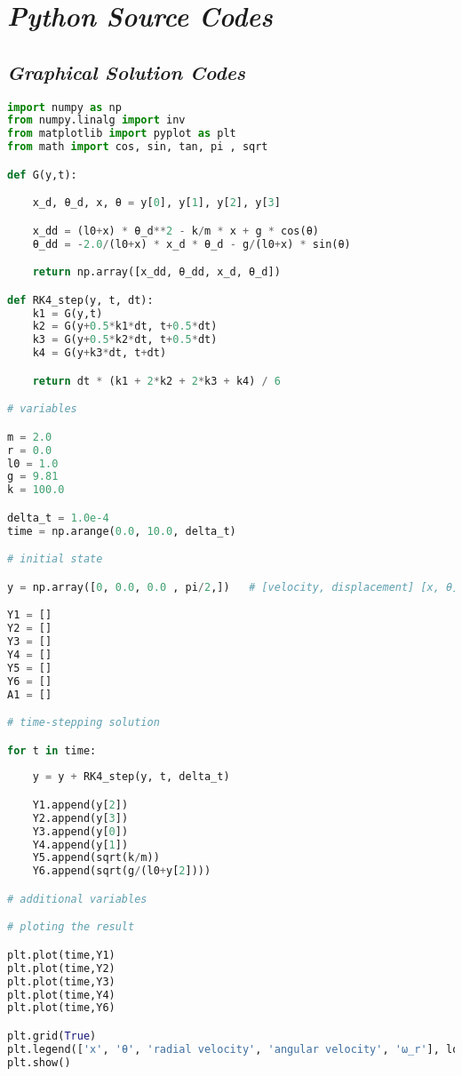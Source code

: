 \newpage

\chapter{\textit{Python Source Codes}}\label{pycode}
        
    \section{\textit{Graphical Solution Codes}}
        
        \begin{lstlisting}[language=Python, caption=\textit{Graphical Solution Python Script for system \textbf{without} Damping}]
import numpy as np 
from numpy.linalg import inv
from matplotlib import pyplot as plt
from math import cos, sin, tan, pi , sqrt

def G(y,t): 	

    x_d, θ_d, x, θ = y[0], y[1], y[2], y[3]

	x_dd = (l0+x) * θ_d**2 - k/m * x + g * cos(θ) 	
	θ_dd = -2.0/(l0+x) * x_d * θ_d - g/(l0+x) * sin(θ) 	

	return np.array([x_dd, θ_dd, x_d, θ_d])

def RK4_step(y, t, dt):
	k1 = G(y,t)
	k2 = G(y+0.5*k1*dt, t+0.5*dt)
	k3 = G(y+0.5*k2*dt, t+0.5*dt)
	k4 = G(y+k3*dt, t+dt)

	return dt * (k1 + 2*k2 + 2*k3 + k4) / 6

# variables

m = 2.0
r = 0.0
l0 = 1.0
g = 9.81
k = 100.0

delta_t = 1.0e-4
time = np.arange(0.0, 10.0, delta_t)

# initial state

y = np.array([0, 0.0, 0.0 , pi/2,])   # [velocity, displacement] [x, θ] 

Y1 = []
Y2 = []
Y3 = []
Y4 = []
Y5 = []
Y6 = []
A1 = []

# time-stepping solution

for t in time:
	
	y = y + RK4_step(y, t, delta_t) 

	Y1.append(y[2])
	Y2.append(y[3])
	Y3.append(y[0])
	Y4.append(y[1])
	Y5.append(sqrt(k/m))
	Y6.append(sqrt(g/(l0+y[2])))

# additional variables

# ploting the result

plt.plot(time,Y1)
plt.plot(time,Y2)
plt.plot(time,Y3)
plt.plot(time,Y4)
plt.plot(time,Y6)

plt.grid(True)
plt.legend(['x', 'θ', 'radial velocity', 'angular velocity', 'ω_r'], loc='lower right')
plt.show()

\end{lstlisting}
        
